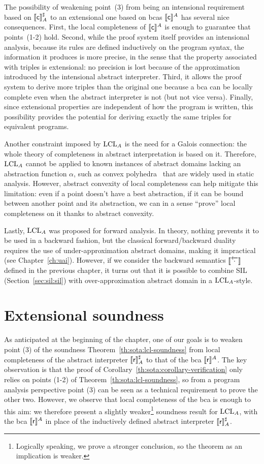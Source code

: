 The possibility of weakening point~(3) from being an intensional requirement based on $\llbracket\mathsf{c}\rrbracket^{\sharp}_A$ to an extensional one based on bcas $\llbracket\mathsf{c}\rrbracket^A$ has several nice consequences.
First, the local completeness of $\llbracket\mathsf{c}\rrbracket^A$ is enough to guarantee that points~(1-2) hold.
Second, while the proof system itself provides an intensional analysis, because its rules are defined inductively on the program syntax, the information it produces is more precise, in the sense that the property associated with triples is extensional: no precision is lost because of the approximation introduced by the intensional abstract interpreter.
Third, it allows the proof system to derive more triples than the original one because a bca can be locally complete even when the abstract interpreter is not (but not vice versa).
Finally, since extensional properties are independent of how the program is written, this possibility provides the potential for deriving exactly the same triples for equivalent programs.

Another constraint imposed by $\text{LCL}_A$ is the need for a Galois connection: the whole theory of completeness in abstract interpretation is based on it. Therefore, $\text{LCL}_A$ cannot be applied to known instances of abstract domains lacking an abstraction function $\alpha$, such as convex polyhedra~\cite{CH78} that are widely used in static analysis. However, abstract convexity of local completeness can help mitigate this limitation: even if a point doesn't have a best abstraction, if it can be bound between another point and its abstraction, we can in a sense ``prove'' local completeness on it thanks to abstract convexity.

Lastly, $\text{LCL}_A$ was proposed for forward analysis. In theory, nothing prevents it to be used in a backward fashion, but the classical forward/backward duality requires the use of under-approximation abstract domains, making it impractical (see Chapter~\ref{ch:uai}). However, if we consider the backward semantics $\llbracket\overleftarrow{\cdot}\rrbracket$ defined in the previous chapter, it turns out that it is possible to combine SIL (Section~\ref{sec:sil:sil}) with over-approximation abstract domain in a $\text{LCL}_A$-style.

\section{Extensional soundness}
As anticipated at the beginning of the chapter, one of our goals is to weaken point (3) of the soundness Theorem~\ref{th:sota:lcl-soundness} from local completeness of the abstract interpreter $\llbracket\mathsf{r}\rrbracket^{\sharp}_A$ to that of the bca $\llbracket\mathsf{r}\rrbracket^A$. The key observation is that the proof of Corollary~\ref{th:sota:corollary-verification} only relies on points (1-2) of Theorem~\ref{th:sota:lcl-soundness}, so from a program analysis perspective point (3) can be seen as a technical requirement to prove the other two. However, we observe that local completeness of the bca is enough to this aim: we therefore present a slightly weaker\footnote{Logically speaking, we prove a stronger conclusion, so the theorem as an implication is weaker.} soundness result for $\text{LCL}_A$, with the bca $\llbracket\mathsf{r}\rrbracket^A$ in place of the inductively defined abstract interpreter $\llbracket\mathsf{r}\rrbracket^{\sharp}_A$.

